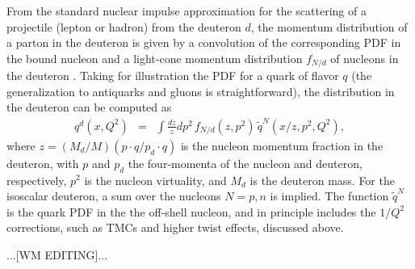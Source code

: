 \documentclass[aps,prd,amsmath,preprint]{revtex4}
\begin{document}
From the standard nuclear impulse approximation for the scattering
of a projectile (lepton or hadron) from the deuteron $d$, the
momentum distribution of a parton in the deuteron is given by a
convolution of the corresponding PDF in the bound nucleon and a
light-cone momentum distribution $f_{N/d}$ of nucleons in the
deuteron \cite{MSToff, KPW94}.  
Taking for illustration the PDF for a quark of flavor $q$ (the
generalization to antiquarks and gluons is straightforward),
the distribution in the deuteron can be computed as
%
\begin{eqnarray}
q^d(x,Q^2)
&=& \int \frac{dz}{z} dp^2\,
    f_{N/d}(z,p^2)\, \widetilde{q}^N(x/z,p^2,Q^2),
\label{eq:genconv}
\end{eqnarray}
%
where $z = (M_d/M)(p \cdot q / p_d \cdot q)$ is the nucleon momentum
fraction in the deuteron, with $p$ and $p_d$ the four-momenta of the
nucleon and deuteron, respectively, $p^2$ is the nucleon virtuality,
and $M_d$ is the deuteron mass.  For the isoscalar deuteron, a sum
over the nucleons $N = p, n$ is implied.
The function $\widetilde{q}^N$ is the quark PDF in the the off-shell
nucleon, and in principle includes the $1/Q^2$ corrections,
such as TMCs and higher twist effects, discussed above.


{\color{red} ...[WM EDITING]...}
\end{document}
